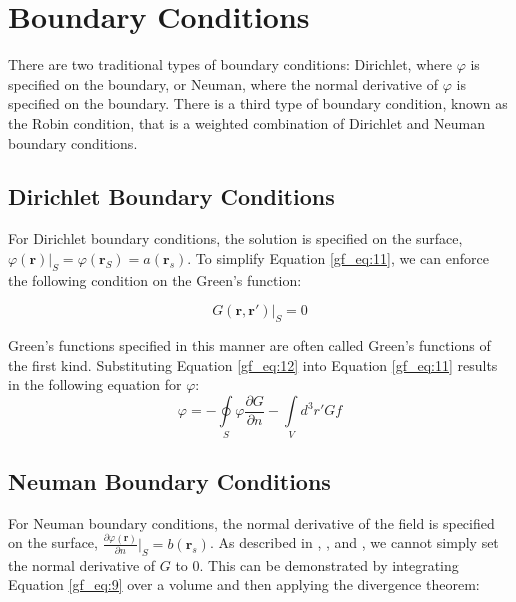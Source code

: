 \section{Boundary Conditions}
There are two traditional types of boundary conditions: Dirichlet, where $\varphi$ is specified on the boundary, or Neuman, where the normal derivative of $\varphi$ is specified on the boundary. There is a third type of boundary condition, known as the Robin condition, that is a weighted combination of Dirichlet and Neuman boundary conditions.

\subsection{Dirichlet Boundary Conditions}
For Dirichlet boundary conditions, the solution is specified on the surface, $\varphi\left(\mathbf{r}\right) |_{S} = \varphi\left(\mathbf{r}_S \right) = a\left(\mathbf{r}_s\right)$. To simplify Equation \ref{gf_eq:11}, we can enforce the following condition on the Green's function:

\begin{equation}
G\left(\mathbf{r},\mathbf{r}' \right)\bigg|_{S}=0
\label{gf_eq:12}
\end{equation}
\renewcommand{\baselinestretch}{2} \small\normalsize

Green's functions specified in this manner are often called Green's functions of the first kind. Substituting Equation \ref{gf_eq:12} into Equation \ref{gf_eq:11} results in the following equation for $\varphi$:
\begin{equation}
\boxed{\varphi = -\oint\limits_{S} \varphi\frac{\partial G}{\partial n} -\int\limits_{V}d^3r' Gf}
\label{gf_eq:13}
\end{equation}
\renewcommand{\baselinestretch}{2} \small\normalsize

\subsection{Neuman Boundary Conditions}
For Neuman boundary conditions, the normal derivative of the field is specified on the surface, $\frac{\partial\varphi\left(\mathbf{r}\right)}{\partial n}|_{S} = b\left(\mathbf{r}_s\right)$. As described in \cite{jackson_classical_em}, \cite{zangwill_modern_em}, and \cite{balanis_advanced}, we cannot simply set the normal derivative of $G$ to $0$. This can be demonstrated by integrating Equation \ref{gf_eq:9} over a volume and then applying the divergence theorem:

